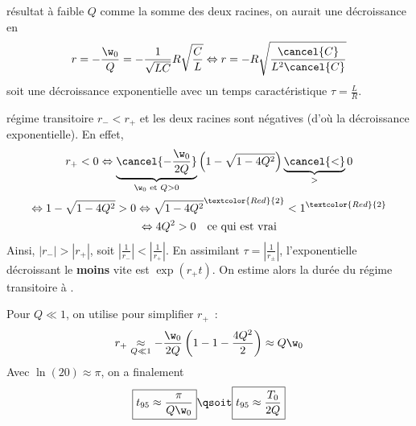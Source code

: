 \documentclass[../main/main.tex]{subfiles}
\begin{document}
\begin{tcbraster}[raster columns=2, raster equal height=rows]
\begin{tcolorbox}[blankest, raster multicolumn=1, space to=\myspace]
\begin{tcbraster}[raster columns=1]
\begin{impo}[label=impo:aperpetitQ]{résultat à faible $Q$}
                comme la somme des deux racines, on aurait une décroissance en
                \begin{gather*}
                    r = -\frac{\w_0}{Q} = - \frac{1}{\sqrt{LC}}R
                    \sqrt{\frac{C}{L}}
                    \Leftrightarrow
                    r = -R \sqrt{\frac{\cancel{C}}{L^2\cancel{C}}}
                \end{gather*}
                soit une décroissance exponentielle avec un temps
                caractéristique $\tau = \frac{L}{R}$.
            \end{impo}
        \end{tcbraster}
    \end{tcolorbox}
    \begin{demo}[label=demo:transiaper]{régime transitoire}
        $r_- < r_+$ et les deux racines sont négatives (d'où la décroissance
        exponentielle). En effet,
        \begin{gather*}
            r_+ < 0
            \Leftrightarrow
            \underbrace{\cancel{-\frac{\w_0}{2Q}}}_{\w_0 \text{ et } Q > 0}
            \left( 1 - \sqrt{1-4Q^2}
                \right) \underbrace{\cancel{<}}_{>} 0\\
            \Leftrightarrow
            1 - \sqrt{1 - 4Q^2} > 0
            \Leftrightarrow
            \sqrt{1-4Q^2}^{\textcolor{Red}{2}} < 1^{\textcolor{Red}{2}}\\
            \Leftrightarrow
            4Q^2 > 0 \quad \text{ce qui est vrai}
        \end{gather*}
        Ainsi, $\left| r_- \right| > \left| r_+ \right|$, soit
        $ \left| \frac{1}{r_-} \right| < \left| \frac{1}{r_+} \right|$. En
        assimilant $\tau = \left| \frac{1}{r_\pm} \right|$, l'exponentielle
        décroissant le \textbf{moins} vite est $\exp(r_+t)$. On estime alors la
        durée du régime transitoire à .\bigbreak

        Pour $Q \ll 1$, on utilise  pour simplifier $r_+$~:
        \begin{gather*}
            r_+ \underset{Q\ll1}{\approx} - \frac{\w_0}{2Q} \left( 1 - 1 -
            \frac{4Q^2}{2} \right) \approx Q\w_0
        \end{gather*}
        Avec $\ln(20) \approx \pi$, on a finalement
        \begin{equation*}
            \boxed{t_{95} \approx \frac{\pi}{Q\w_0}} \qsoit \boxed{t_{95} \approx
            \frac{T_0}{2Q}}
        \end{equation*}
    \end{demo}
\end{tcbraster}
\end{document}
